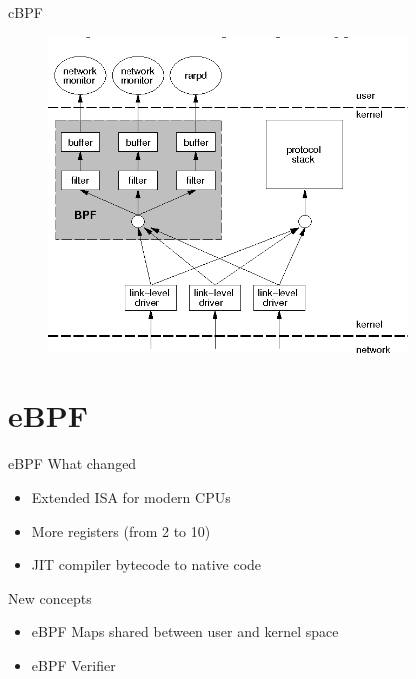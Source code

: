 \documentclass{beamer}
\begin{document}
\begin{frame}{cBPF}
  \begin{figure}
    \includegraphics[width=0.85\textwidth]{./cbpf.png}
  \end{figure}
\end{frame}



\section{eBPF}
\begin{frame}{eBPF}
  What changed
  \begin{itemize}
    \item Extended ISA for modern CPUs
    \item More registers (from 2 to 10)
    \item JIT compiler bytecode to native code
  \end{itemize}

  New concepts
  \begin{itemize}
    \item eBPF Maps shared between user and kernel space
    \item eBPF Verifier
  \end{itemize}
\end{frame}
\end{document}
